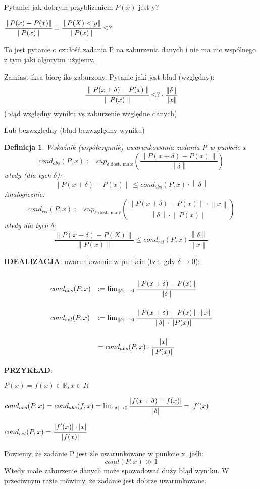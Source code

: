 \documentclass[hidelinks,a4paper,fleqn,oneside]{book}
\newcommand{\RR}{\mathbb{R}}
\newcommand{\ra}{\rightarrow}
\newcommand{\norm}[1]{\left\lVert#1\right\rVert}
\newtheorem{defi}{Definicja}
\begin{document}
Pytanie: jak dobrym przybliżeniem $P(x)$ jest y? 

$\cfrac{\norm{P(x) - P(\tilde{x})}}{\norm{P(x)}} = \cfrac{\norm{P(X) < y}}{\norm{P(x)}} \leq ?$

To jest pytanie o czułość zadania P na zaburzenia danych i nie ma nic wspólnego z tym jaki algorytm użyjemy.


Zamiast iksa biorę iks zaburzony. Pytanie jaki jest błąd (względny):
\[
	\cfrac{\parallel P(x + \delta) - P(x) \parallel}{\parallel P(x) \parallel} \leq ? \cdot \frac{\norm{\delta}}{\norm{x}}
\]
(błąd względny wyniku vs zaburzenie względne danych)

Lub bezwzględny (błąd bezwzględny wyniku)


\begin{defi}
	Wskaźnik (współczynnik) uwarunkowania zadania P w punkcie x
	\[
		cond_{abs}(P, x) := sup_{\delta\textrm{ dost. małe}}\left(\frac{\norm{P(x + \delta) - P(x)}}{\norm{\delta}}\right)
	\]
	wtedy (dla tych $\delta$):
	\[
		\norm{P(x + \delta) - P(x)} \leq cond_{abs} (P, x) \cdot \norm{\delta}
	\]
	Analogicznie:
	\[
		cond_{rel}(P, x) := sup_{\delta\textrm{ dost. małe}}\left(\frac{\norm{P(x + \delta) - P(x)} \cdot \norm{x}}{\norm{\delta} \cdot \norm{P(x)}}\right)
	\]
	wtedy dla tych $\delta$:
	\[
		\frac{\norm{P(x + \delta) - P(X)}}{\norm{P(x)}} \leq cond_{rel} (P, x) \frac{\norm{\delta}}{\norm{x}}
	\]
	
\end{defi}

\textbf{IDEALIZACJA}: uwarunkowanie w punkcie (tzn. gdy $\delta \ra 0$):
\[\def\arraystretch{3.4}
	\begin{array}{ll}
		cond_{abs}(P, x) & := \lim_{\norm{\delta} \ra 0} \cfrac{\norm{P(x + \delta) - P(x)}}{\norm{\delta}} \\
		cond_{rel}(P, x) & := \lim_{\norm{\delta} \ra 0} \cfrac{\norm{P(x + \delta) - P(x)} \cdot \norm{x}}{\norm{\delta} \cdot \norm{P(x)}} \\ & = cond_{abs} (P, x) \cdot \cfrac{\norm{x}}{\norm{P(x)}}
	\end{array}
\]

\textbf{PRZYKŁAD}:

$P(x) = f(x) \in \RR, x \in R$

$cond_{abs} (P, x) = cond_{abs}(f, x) = \lim_{| \delta | \ra 0} \cfrac{| f(x + \delta) - f(x)|}{| \delta |} = |f'(x)|$

$cond_{rel}(P, x) = \cfrac{|f'(x)| \cdot |x|}{|f(x)|}$

Powiemy, że zadanie P jest źle uwarunkowane w punkcie x, jeśli:
\[
	cond(P, x) \gg 1
\]
Wtedy małe zaburzenie danych może spowodować duży błąd wyniku. W przeciwnym razie mówimy, że zadanie jest dobrze uwarunkowane.
\end{document}
